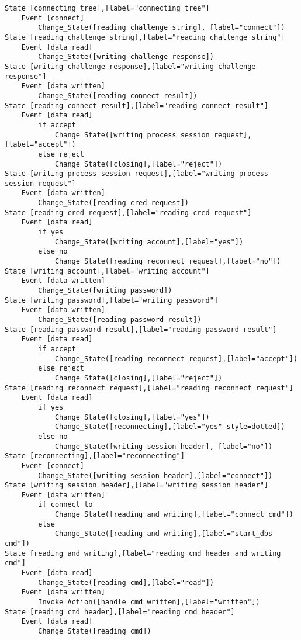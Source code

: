 \begin{comment}
This is the state machine for mpiexec for smpd.
Graph [mpiexec for smpd],
      [size="7.5, 10"]
\end{comment}
\begin{verbatim}
State [connecting tree],[label="connecting tree"]
	Event [connect]
		Change_State([reading challenge string], [label="connect"])
State [reading challenge string],[label="reading challenge string"]
	Event [data read]
		Change_State([writing challenge response])
State [writing challenge response],[label="writing challenge response"]
	Event [data written]
		Change_State([reading connect result])
State [reading connect result],[label="reading connect result"]
	Event [data read]
		if accept
			Change_State([writing process session request], [label="accept"])
		else reject
			Change_State([closing],[label="reject"])
State [writing process session request],[label="writing process session request"]
	Event [data written]
		Change_State([reading cred request])
State [reading cred request],[label="reading cred request"]
	Event [data read]
		if yes
			Change_State([writing account],[label="yes"])
		else no
			Change_State([reading reconnect request],[label="no"])
State [writing account],[label="writing account"]
	Event [data written]
		Change_State([writing password])
State [writing password],[label="writing password"]
	Event [data written]
		Change_State([reading password result])
State [reading password result],[label="reading password result"]
	Event [data read]
		if accept
			Change_State([reading reconnect request],[label="accept"])
		else reject
			Change_State([closing],[label="reject"])
State [reading reconnect request],[label="reading reconnect request"]
	Event [data read]
		if yes
			Change_State([closing],[label="yes"])
			Change_State([reconnecting],[label="yes" style=dotted])
		else no
			Change_State([writing session header], [label="no"])
State [reconnecting],[label="reconnecting"]
	Event [connect]
		Change_State([writing session header],[label="connect"])
State [writing session header],[label="writing session header"]
	Event [data written]
		if connect_to
			Change_State([reading and writing],[label="connect cmd"])
		else
			Change_State([reading and writing],[label="start_dbs cmd"])
State [reading and writing],[label="reading cmd header and writing cmd"]
	Event [data read]
		Change_State([reading cmd],[label="read"])
	Event [data written]
		Invoke_Action([handle cmd written],[label="written"])
State [reading cmd header],[label="reading cmd header"]
	Event [data read]
		Change_State([reading cmd])

\end{verbatim}
